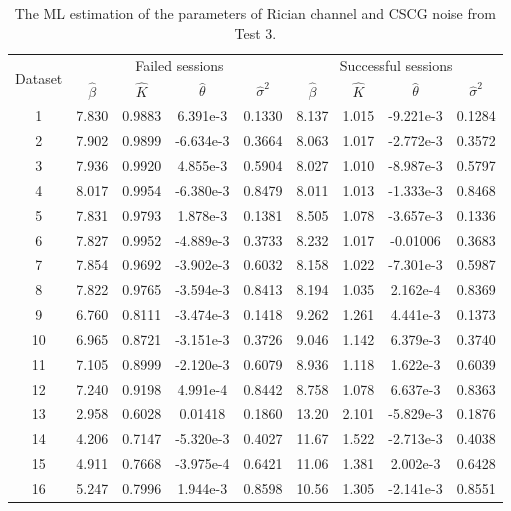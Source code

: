 \documentclass[journal,draftcls,onecolumn,12pt,twoside]{IEEEtran}
\begin{document}
\begin{table}[!t]
  \renewcommand{\arraystretch}{1.3}
  \caption{The ML estimation of the parameters of Rician channel and CSCG
  noise from Test 3.}
  \label{tab:ML}
  \centering
  \begin{tabular}{c|cccc|cccc}
    \hline
    \multirow{2}{*}{Dataset}  & \multicolumn{4}{c|}{Failed sessions} &
    \multicolumn{4}{c}{Successful sessions} \\
    \cline{2-9}
    & $\hat{\beta}$ & $\hat{K}$ & $\hat{\theta}$ & $\hat{\sigma}^2$
    & $\hat{\beta}$ & $\hat{K}$ & $\hat{\theta}$ & $\hat{\sigma}^2$ \\
    \hline
    1 & 7.830 & 0.9883 & 6.391e-3 &
    0.1330 & 8.137 & 1.015 & -9.221e-3 & 0.1284
    \\
    2 & 7.902 & 0.9899 & -6.634e-3 &
    0.3664 & 8.063 & 1.017 & -2.772e-3 & 0.3572 \\
    3 & 7.936 & 0.9920 & 4.855e-3 &
    0.5904 & 8.027 & 1.010 & -8.987e-3 & 0.5797
    \\
    4 & 8.017 & 0.9954 & -6.380e-3 &
    0.8479 & 8.011 & 1.013 & -1.333e-3 & 0.8468 \\
    \hline
    5 & 7.831 & 0.9793 & 1.878e-3 &
    0.1381 & 8.505 & 1.078 & -3.657e-3 & 0.1336
    \\
    6 & 7.827 & 0.9952 & -4.889e-3
    & 0.3733  & 8.232 & 1.017 & -0.01006 & 0.3683
    \\
    7 & 7.854 & 0.9692 & -3.902e-3 &
    0.6032 & 8.158 & 1.022 & -7.301e-3 & 0.5987
    \\
    8 & 7.822 & 0.9765 & -3.594e-3 &
    0.8413 & 8.194 & 1.035 & 2.162e-4 & 0.8369 \\
    \hline
    9 & 6.760 & 0.8111 & -3.474e-3 &
    0.1418 & 9.262 & 1.261 & 4.441e-3 & 0.1373
    \\
    10 & 6.965 & 0.8721 & -3.151e-3 &
    0.3726 & 9.046 & 1.142 & 6.379e-3 & 0.3740
    \\
    11 & 7.105 & 0.8999 & -2.120e-3 &
    0.6079 & 8.936 & 1.118 & 1.622e-3 & 0.6039 \\
    12 & 7.240 & 0.9198 & 4.991e-4 &
    0.8442 & 8.758 & 1.078 & 6.637e-3 & 0.8363 \\
    \hline
    13 & 2.958 & 0.6028 & 0.01418 &
    0.1860 & 13.20 & 2.101 & -5.829e-3 & 0.1876
    \\
    14 & 4.206 & 0.7147 & -5.320e-3 &
    0.4027 & 11.67 & 1.522 & -2.713e-3 & 0.4038 \\
    15 & 4.911 & 0.7668 & -3.975e-4 &
    0.6421 & 11.06 & 1.381 & 2.002e-3 & 0.6428 \\
    16 & 5.247 & 0.7996 & 1.944e-3 &
    0.8598 & 10.56 & 1.305 & -2.141e-3 & 0.8551 \\
    \hline
  \end{tabular}
\end{table}
  
\end{document}

